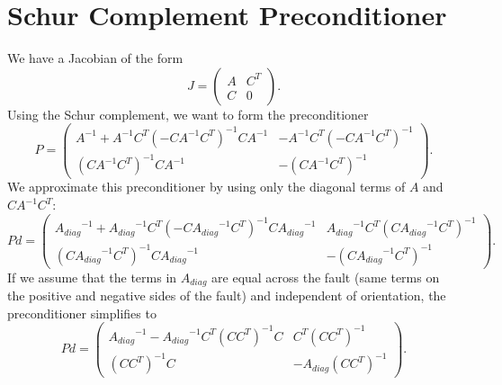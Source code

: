 \documentclass{article}[10pt]
\newcommand{\Adiag}{\ensuremath{A_\mathit{diag}}}
\begin{document}
\section{Schur Complement Preconditioner}

We have a Jacobian of the form
\begin{equation}
  J = \left( \begin{array}{cc}
    A & C^T \\
    C & 0
  \end{array} \right).
\end{equation}
Using the Schur complement, we want to form the preconditioner
\begin{equation}
  P = \left( \begin{array}{cc}
    A^{-1} + A^{-1} C^T (-C A^{-1} C^T)^{-1} C A^{-1} &
    -A^{-1} C^T (-C A^{-1} C^T)^{-1} \\
    (C A^{-1} C^T)^{-1} C A^{-1} & -(C A^{-1} C^T)^{-1}
  \end{array} \right).
\end{equation}
We approximate this preconditioner by using only the diagonal terms of $A$ and $C A^{-1} C^T$:
\begin{equation}
  Pd = \left( \begin{array}{cc}
    \Adiag^{-1} + \Adiag^{-1} C^T (-C \Adiag^{-1} C^T)^{-1} C \Adiag^{-1} &
    \Adiag^{-1} C^T (C \Adiag^{-1} C^T)^{-1} \\
    (C \Adiag^{-1} C^T)^{-1} C \Adiag^{-1} & -(C \Adiag^{-1} C^T)^{-1}
  \end{array} \right).
\end{equation}
If we assume that the terms in $\Adiag$ are equal across the fault (same terms on the positive and negative sides of the fault) and independent of orientation, the preconditioner simplifies to
\begin{equation}
  Pd = \left( \begin{array}{cc}
    \Adiag^{-1} - \Adiag^{-1} C^T (C C^T)^{-1} C &
    C^T (C C^T)^{-1} \\
    (C C^T)^{-1} C & -\Adiag (C C^T)^{-1}
  \end{array} \right).
\end{equation}


\end{document}
